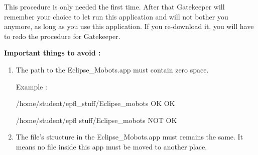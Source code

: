 \documentclass[a4paper]{article}
\begin{document}
This procedure is only needed the first time. After that Gatekeeper will remember your choice to let run this application and will not bother you anymore, as long as you use this application. If you re-download it, you will have to redo the procedure for Gatekeeper.



\textbf{Important things to avoid :}

\begin{enumerate}
\item The path to the Eclipse\_Mobots.app must contain zero space. 

Example :

/home/student/epfl\_stuff/Eclipse\_mobots OK   OK

/home/student/epfl stuff/Eclipse\_mobots NOT OK

\item The file's structure in the Eclipse\_Mobots.app must remains the same. It means no file inside this app must be moved to another place.
\end{enumerate}
\end{document}

